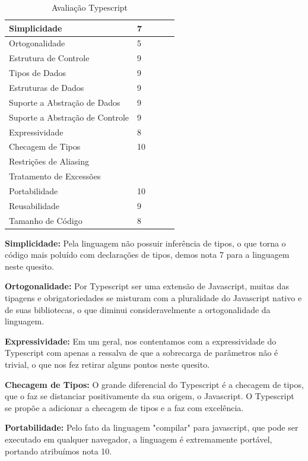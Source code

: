 \documentclass[rel_mlp]{iiufrgs}
\numberwithin{figure}{chapter}
\begin{document}
\begin{table}[h]
\centering
\caption{Avaliação Typescript}
\label{aval}
\begin{tabular}{|l|l|l|l|l|}
\hline
Simplicidade          			&  7  \\ \hline
Ortogonalidade        			&  5  \\ \hline
Estrutura de Controle 			&  9  \\ \hline
Tipos de Dados        			&  9  \\ \hline
Estruturas de Dados   			&  9  \\ \hline
Suporte a Abstração de Dados    &  9  \\ \hline
Suporte a Abstração de Controle	&  9  \\ \hline
Expressividade        			&  8  \\ \hline
Checagem de Tipos     			&  10 \\ \hline
Restrições de Aliasing        	&  	  \\ \hline
Tratamento de Excessões 		&  	  \\ \hline
Portabilidade        			&  10 \\ \hline
Reusabilidade          			&  9  \\ \hline
Tamanho de Código        		&  8  \\ \hline
\end{tabular}
\end{table}

\textbf{Simplicidade:} Pela linguagem não possuir inferência de tipos, o que torna o código mais poluído com declarações de tipos, demos nota 7 para a linguagem neste quesito.

\textbf{Ortogonalidade:} Por Typescript ser uma extensão de Javascript, muitas das tipagens e obrigatoriedades se misturam com a pluralidade do Javascript nativo e de suas bibliotecas, o que diminui consideravelmente a ortogonalidade da linguagem.

\textbf{Expressividade:} Em um geral, nos contentamos com a expressividade do Typescript com apenas a ressalva de que a sobrecarga de parâmetros não é trivial, o que nos fez retirar alguns pontos neste quesito.

\textbf{Checagem de Tipos:} O grande diferencial do Typescript é a checagem de tipos, que o faz se distanciar positivamente da sua origem, o Javascript. O Typescript se propõe a adicionar a checagem de tipos e a faz com excelência.

\textbf{Portabilidade:} Pelo fato da linguagem "compilar" para javascript, que pode ser executado em qualquer navegador, a linguagem é extremamente portável, portando atribuímos nota 10.
\end{document}
